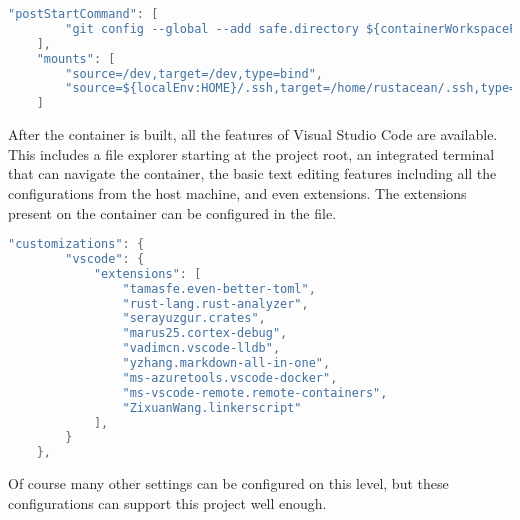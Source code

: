 \begin{lstlisting}[language=C,frame=single,float=!ht,label={lst:devcont-posttart},caption={Post Start Commands and Mounts}]
	"postStartCommand": [
		"git config --global --add safe.directory ${containerWorkspaceFolder}"
	],
    "mounts": [
		"source=/dev,target=/dev,type=bind",
		"source=${localEnv:HOME}/.ssh,target=/home/rustacean/.ssh,type=bind,consistency=cached"
	]
\end{lstlisting}


After the container is built, all the features of Visual Studio Code are available. This includes a file explorer starting at the project root, an integrated terminal that can navigate the container, the basic text editing features including all the configurations from the host machine, and even extensions. The extensions present on the container can be configured in the  file.

\begin{lstlisting}[language=C,frame=single,float=!ht,label={lst:devcont-ext},caption={List of VSCode Extensions in the Container}]
    "customizations": {
        "vscode": {
            "extensions": [
                "tamasfe.even-better-toml",
                "rust-lang.rust-analyzer",
                "serayuzgur.crates",
                "marus25.cortex-debug",
                "vadimcn.vscode-lldb",
                "yzhang.markdown-all-in-one",
				"ms-azuretools.vscode-docker",
				"ms-vscode-remote.remote-containers",
				"ZixuanWang.linkerscript"
            ],
        }
    },
\end{lstlisting}

Of course many other settings can be configured on this level, but these configurations can support this project well enough.
